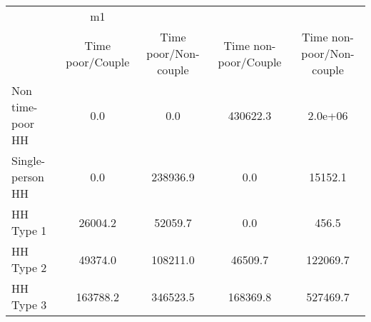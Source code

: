 \begin{tabular}{l*{4}{c}}
\hline\hline
            &          m1&            &            &            \\
            &Time poor/Couple&Time poor/Non-couple&Time non-poor/Couple&Time non-poor/Non-couple\\
\hline
Non time-poor HH&         0.0&         0.0&    430622.3&     2.0e+06\\
Single-person HH&         0.0&    238936.9&         0.0&     15152.1\\
HH Type 1   &     26004.2&     52059.7&         0.0&       456.5\\
HH Type 2   &     49374.0&    108211.0&     46509.7&    122069.7\\
HH Type 3   &    163788.2&    346523.5&    168369.8&    527469.7\\
\hline\hline
\end{tabular}
